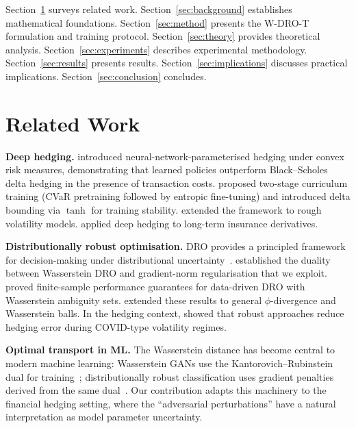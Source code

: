 \documentclass[11pt]{article}
\begin{document}
Section~\ref{sec:related} surveys related work. Section~\ref{sec:background} establishes mathematical foundations. Section~\ref{sec:method} presents the W-DRO-T formulation and training protocol. Section~\ref{sec:theory} provides theoretical analysis. Section~\ref{sec:experiments} describes experimental methodology. Section~\ref{sec:results} presents results. Section~\ref{sec:implications} discusses practical implications. Section~\ref{sec:conclusion} concludes.

\section{Related Work}
\label{sec:related}

\textbf{Deep hedging.}
\citet{buehler2019deep} introduced neural-network-parameterised hedging under convex risk measures, demonstrating that learned policies outperform Black--Scholes delta hedging in the presence of transaction costs.  \citet{kozyra2019deep} proposed two-stage curriculum training (CVaR pretraining followed by entropic fine-tuning) and introduced delta bounding via $\tanh$ for training stability.  \citet{horvath2021deep} extended the framework to rough volatility models.  \citet{carbonneau2021deep} applied deep hedging to long-term insurance derivatives.

\textbf{Distributionally robust optimisation.}
DRO provides a principled framework for decision-making under distributional uncertainty~\citep{rahimian2019dro}.  \citet{blanchet2019quantifying} established the duality between Wasserstein DRO and gradient-norm regularisation that we exploit.  \citet{esfahani2018data} proved finite-sample performance guarantees for data-driven DRO with Wasserstein ambiguity sets.  \citet{gao2023distributionally} extended these results to general $\phi$-divergence and Wasserstein balls.  In the hedging context, \citet{lutkebohmert2019robust} showed that robust approaches reduce hedging error during COVID-type volatility regimes.

\textbf{Optimal transport in ML.}
The Wasserstein distance has become central to modern machine learning: Wasserstein GANs use the Kantorovich--Rubinstein dual for training~\citep{gao2023distributionally}; distributionally robust classification uses gradient penalties derived from the same dual~\citep{esfahani2018data}.  Our contribution adapts this machinery to the financial hedging setting, where the ``adversarial perturbations'' have a natural interpretation as model parameter uncertainty.
\end{document}
